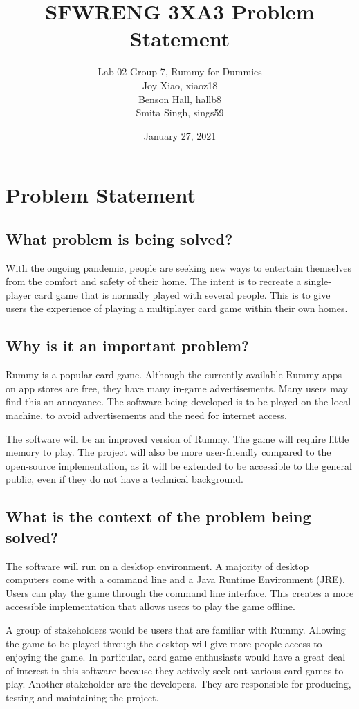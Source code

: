\documentclass[12pt]{article}
\title{SFWRENG 3XA3 Problem Statement}
\author{
	Lab 02 Group 7, Rummy for Dummies
		\\ Joy Xiao, xiaoz18
        \\ Benson Hall, hallb8
        \\ Smita Singh, sings59
}
\date{January 27, 2021}
\begin{document}
\maketitle

\section{Problem Statement}
\subsection*{What problem is being solved?}
With the ongoing pandemic, people are seeking new ways to entertain themselves from the comfort and safety of their home. The intent is to recreate a single-player card game that is normally played with several people. This is to give users the experience of playing a multiplayer card game within their own homes.

\subsection*{Why is it an important problem?}
Rummy is a popular card game. Although the currently-available Rummy apps on app stores are free, they have many in-game advertisements. Many users may find this an annoyance. The software being developed is to be played on the local machine, to avoid advertisements and the need for internet access.

The software will be an improved version of Rummy. The game will require little memory to play. The project will also be more user-friendly compared to the open-source implementation, as it will be extended to be accessible to the general public, even if they do not have a technical background.

\subsection*{What is the context of the problem being solved?}
The software will run on a desktop environment. A majority of desktop computers come with a command line and a Java Runtime Environment (JRE). Users can play the game through the command line interface. This creates a more accessible implementation that allows users to play the game offline.

A group of stakeholders would be users that are familiar with Rummy. Allowing the game to be played through the desktop will give more people access to enjoying the game. In particular, card game enthusiasts would have a great deal of interest in this software because they actively seek out various card games to play. Another stakeholder are the developers. They are responsible for producing, testing and maintaining the project.
\end{document}
